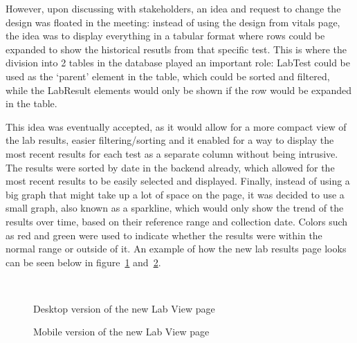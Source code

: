 However, upon discussing with stakeholders, an idea and request to change the design was floated in the meeting: instead of using the design from vitals page, the idea was to display everything in a tabular format where rows could be expanded to show the historical resutls from that specific test. This is where the division into 2 tables in the database played an important role: LabTest could be used as the `parent' element in the table, which could be sorted and filtered, while the LabResult elements would only be shown if the row would be expanded in the table. 

This idea was eventually accepted, as it would allow for a more compact view of the lab results, easier filtering/sorting and it enabled for a way to display the most recent results for each test as a separate column without being intrusive. The results were sorted by date in the backend already, which allowed for the most recent results to be easily selected and displayed. Finally, instead of using a big graph that might take up a lot of space on the page, it was decided to use a small graph, also known as a sparkline, which would only show the trend of the results over time, based on their reference range and collection date. Colors such as red and green were used to indicate whether the results were within the normal range or outside of it. An example of how the new lab results page looks can be seen below in figure~\ref{fig:labs_page} and~\ref{fig:labs_page_mobile}.

\begin{figure}[ht]
  \centering
  \\[\baselineskip]
  \caption{Desktop version of the new Lab View page}\label{fig:labs_page}
\end{figure}

\FloatBarrier{}

\begin{figure}[ht]
  \centering
  \hfill
  \caption{Mobile version of the new Lab View page}\label{fig:labs_page_mobile}
\end{figure}

\FloatBarrier{}


